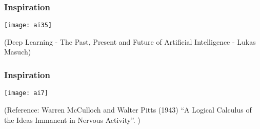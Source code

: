 \begin{frame}[fragile] \frametitle{Inspiration}
\begin{center}
\texttt{[image: ai35]}
\end{center}
{\tiny (Deep Learning - The Past, Present and Future of Artificial Intelligence - Lukas Masuch)}
\end{frame}
\begin{frame}[fragile] \frametitle{Inspiration}

\begin{center}
\texttt{[image: ai7]}
\end{center}
\tiny{(Reference: Warren McCulloch and Walter Pitts (1943) ``A Logical Calculus of the Ideas Immanent in Nervous Activity''. )}
\end{frame}





